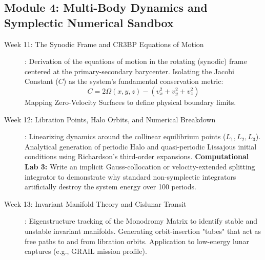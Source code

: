 \documentclass[11pt, letterpaper]{article}
\begin{document}
\subsection*{Module 4: Multi-Body Dynamics and Symplectic Numerical Sandbox}
\begin{description}
    \item[Week 11: The Synodic Frame and CR3BP Equations of Motion]: Derivation of the equations of motion in the rotating (synodic) frame centered at the primary-secondary barycenter. Isolating the Jacobi Constant ($C$) as the system's fundamental conservation metric:
    \begin{equation}
        C = 2\Omega(x, y, z) - (v_x^2 + v_y^2 + v_z^2)
    \end{equation}
    Mapping Zero-Velocity Surfaces to define physical boundary limits.
    
    \item[Week 12: Libration Points, Halo Orbits, and Numerical Breakdown]: Linearizing dynamics around the collinear equilibrium points ($L_1, L_2, L_3$). Analytical generation of periodic Halo and quasi-periodic Lissajous initial conditions using Richardson's third-order expansions.
    \textbf{Computational Lab 3:} Write an implicit Gauss-collocation or velocity-extended splitting integrator to demonstrate why standard non-symplectic integrators artificially destroy the system energy over 100 periods.
    
    \item[Week 13: Invariant Manifold Theory and Cislunar Transit]: Eigenstructure tracking of the Monodromy Matrix to identify stable and unstable invariant manifolds. Generating orbit-insertion "tubes" that act as free paths to and from libration orbits. Application to low-energy lunar captures (e.g., GRAIL mission profile).
\end{description}
\end{document}

